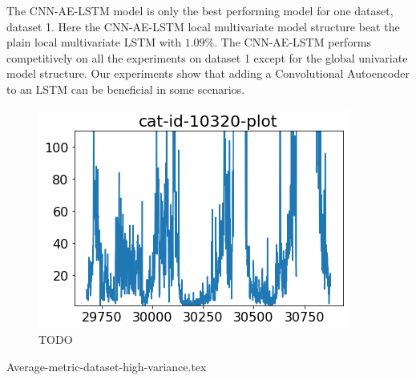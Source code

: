 













\iffalse
  The CNN-AE-LSTM model is only the best performing model for one dataset, dataset 1.
  Here the CNN-AE-LSTM local multivariate model structure beat the plain local multivariate LSTM with $1.09\%$.
  The CNN-AE-LSTM performs competitively on all the experiments on dataset 1 except for the global univariate model structure.
  Our experiments show that adding a Convolutional Autoencoder to an LSTM can be beneficial in some scenarios.


  \begin{figure}[h!]
    \centering
    \includegraphics[width=\textwidth]{./figs/code_generated/data_exploration/cat-id-10320-plot.png}
    \hfill
    \caption{TODO}
    \label{fig:cat-id-10320-cnn-ae-beat-lstm}
  \end{figure}

  {Average-metric-dataset-high-variance.tex}

